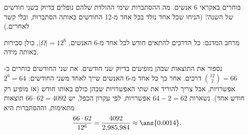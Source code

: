 בוחרים באקראי 6 אנשים. מה ההסתברות שימי ההולדת שלהם נופלים בדיוק בשני חודשים של השנה? (הניחו שכל אחד נולד בכל אחד מ-12 החודשים באותה הסתברות, ובלי קשר לאחרים.)
\begin{solbox}
מרחב המדגם: כל הדרכים להתאים חודש לכל אחד מ-6 האנשים, $|\Omega|=12^6$, כולן סבירות באותה מידה.

נספור את התוצאות שבהן מופיעים בדיוק שני חודשים. את שני החודשים בוחרים ב-$\binom{12}2=66$ דרכים. אחר כך כל אחד מ-6 האנשים שייך לאחד משני החודשים: $2^6=64$ אפשרויות, אבל צריך להוריד את שתי האפשרויות שבהן כולם באותו חודש (אז מופיע רק חודש אחד). נשארות $64-2=62$ אפשרויות. לפי עקרון הכפל, יש $66\cdot62=4092$ תוצאות מתאימות, וההסתברות היא
\[
\frac{66\cdot62}{12^6}=\frac{4092}{2{,}985{,}984}\approx\ans{0.0014}.
\]
\end{solbox}
